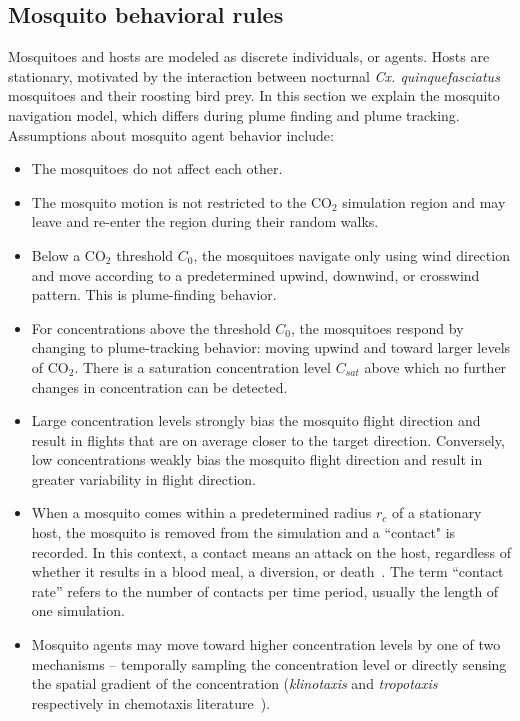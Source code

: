 \documentclass[10pt]{article}
\begin{document}
\subsection*{Mosquito behavioral rules}
Mosquitoes and hosts are modeled as discrete individuals, or agents. Hosts are stationary, motivated by the interaction between nocturnal \textit{Cx. quinquefasciatus} mosquitoes and their roosting bird prey. In this
section we explain the mosquito navigation model, which differs during plume finding and plume tracking. 
Assumptions about mosquito agent behavior include:
\begin{itemize}
	\item The mosquitoes do not affect each other.
	\item The mosquito motion is not restricted to the $\mbox{CO}_2$ simulation region and may leave and re-enter the
	    region during their random walks.
\item
Below a $\mbox{CO}_2$ threshold $C_0$, the mosquitoes navigate only using wind direction and move according to a predetermined upwind, downwind, or crosswind pattern.  This is plume-finding behavior.
\item For concentrations above the threshold $C_0$, the
    mosquitoes respond by changing to plume-tracking behavior: moving upwind and
   toward larger levels of $\mbox{CO}_2$. There is a saturation concentration level
    $C_{sat}$ above which no further changes in concentration can be detected.
\item Large concentration levels strongly bias the mosquito flight direction and result in 
flights that are on average closer to the target direction.  Conversely, low 
concentrations weakly bias the mosquito flight direction and result in greater variability in flight direction.
\item When a mosquito comes within a predetermined radius
    $r_c$ of a stationary host, the mosquito is removed from the simulation and a ``contact" is recorded. In this
    context, a contact means an attack on the host, regardless of whether it results in a blood meal, a diversion, or 
    death~\cite{OkumuModel2010}. The term ``contact rate'' refers to the number of contacts per time period, usually the length of one simulation. 
\item 	Mosquito agents may move toward higher concentration levels by one of two mechanisms -- temporally sampling the concentration level or directly sensing the spatial gradient of the concentration (\textit{klinotaxis} and \textit{tropotaxis} respectively in chemotaxis literature~\cite{Vickers2000}).

\end{itemize}
	
\end{document}
